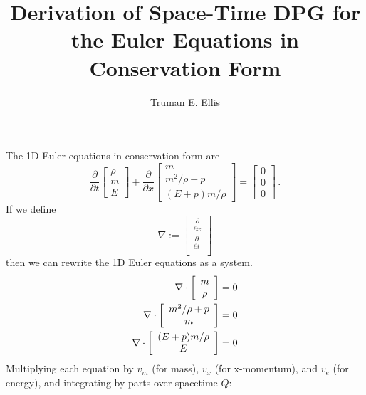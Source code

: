 \documentclass{article}
\author{Truman E. Ellis}
\title{Derivation of Space-Time DPG for the Euler Equations in Conservation
Form}
\begin{document}
\maketitle

The 1D Euler equations in conservation form are
\[
\frac{\partial}{\partial t}
\left[
\begin{array}{c}
   \rho\\
   m\\
   E
\end{array}
\right]
+
\frac{\partial}{\partial x}
\left[
\begin{array}{c}
   m\\
   m^2/\rho+p\\
   (E+p)m/\rho
\end{array}
\right]
=
\left[
\begin{array}{c}
   0\\
   0\\
   0
\end{array}
\right]\,.
\]
If we define
\[
\nabla:=
\left[
\begin{array}{c}
   \frac{\partial}{\partial x}\\
   \frac{\partial}{\partial t}\\
\end{array}
\right]
\]
then we can rewrite the 1D Euler equations as a system.
\begin{align*}
\nabla\cdot
\left[
\begin{array}{c}
   m\\
   \rho\\
\end{array}
\right]
&=0\\
\nabla\cdot
\left[
\begin{array}{c}
   m^2/\rho+p\\
   m\\
\end{array}
\right]
&=0\\
\nabla\cdot
\left[
\begin{array}{c}
   (E + p)m/\rho\\
   E\\
\end{array}
\right]
&=0
\end{align*}
Multiplying each equation by $v_m$ (for mass), $v_x$ (for x-momentum), and
$v_e$ (for energy), and integrating by parts over spacetime $Q$:
\end{document}
